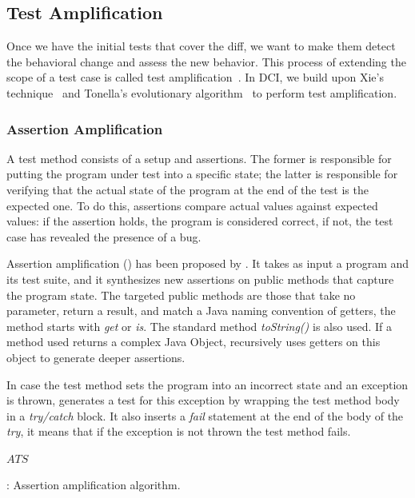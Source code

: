 \subsection{Test Amplification}

Once we have the initial tests that cover the diff, we want to make them detect the behavioral change and assess the new behavior.
This process of extending the scope of a test case is called test amplification~\cite{zhang2012}.
In DCI, we build upon Xie's technique~\cite{TaoXie2006} and Tonella's evolutionary algorithm~\cite{tonella} to perform test amplification.

\subsubsection{Assertion Amplification}
\label{subsec:aampl}

A test method consists of a setup and assertions.
The former is responsible for putting the program under test into a specific state; the latter is responsible for verifying that the actual state of the program at the end of the test is the expected one.
To do this, assertions compare actual values against expected values: if the assertion holds, the program is considered correct, if not, the test case has revealed the presence of a bug.

Assertion amplification (\aampl) has been proposed by \cite{TaoXie2006}.
It takes as input a program and its test suite, and it synthesizes new assertions on public methods that capture the program state.
The targeted public methods are those that take no parameter, return a result, and match a Java naming convention of getters, \eg the method starts with \emph{get} or \emph{is}. The standard method \emph{toString()} is also used.
If a method used returns a complex Java Object, \aampl recursively uses getters on this object to generate deeper assertions.

In case the test method sets the program into an incorrect state and an exception is thrown, \aampl generates a test for this exception by wrapping the test method body in a \emph{try/catch} block. 
It also inserts a \emph{fail} statement at the end of the body of the \emph{try}, \ie it means that if the exception is not thrown the test method fails.

\begin{algorithm}[h]
\begin{algorithmic}[1]
    \EndFor
\EndFor
\Return $ATS$
\end{algorithmic}
\caption{\aampl: Assertion amplification algorithm.}
\label{algo:aampl}
\end{algorithm}

